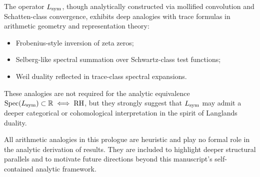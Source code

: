 The operator \( L_{\mathrm{sym}} \), though analytically constructed via mollified convolution and Schatten-class convergence, exhibits deep analogies with trace formulas in arithmetic geometry and representation theory:
\begin{itemize}
  \item Frobenius-style inversion of zeta zeros;
  \item Selberg-like spectral summation over Schwartz-class test functions;
  \item Weil duality reflected in trace-class spectral expansions.
\end{itemize}

These analogies are not required for the analytic equivalence \( \operatorname{Spec}(L_{\mathrm{sym}}) \subset \mathbb{R} \iff \mathrm{RH} \), but they strongly suggest that \( L_{\mathrm{sym}} \) may admit a deeper categorical or cohomological interpretation in the spirit of Langlands duality.

\begin{remark}
All arithmetic analogies in this prologue are heuristic and play no formal role in the analytic derivation of results. They are included to highlight deeper structural parallels and to motivate future directions beyond this manuscript’s self-contained analytic framework.
\end{remark}

